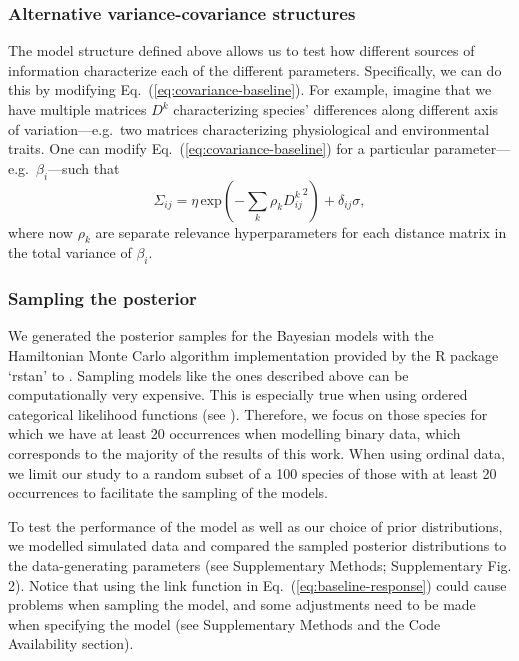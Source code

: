 \documentclass[11pt, a4paper]{article}
\begin{document}
\subsubsection*{Alternative variance-covariance structures}
The model structure defined above allows us to test how different sources of information characterize each of the different parameters. Specifically, we can do this by modifying Eq.~(\ref{eq:covariance-baseline}). For example, imagine that we have multiple matrices $D^k$ characterizing species' differences along different axis of variation---e.g.~two matrices characterizing physiological and environmental traits. One can modify Eq.~(\ref{eq:covariance-baseline}) for a particular parameter---e.g.~$\beta_{i}$---such that
\begin{equation} 
\Sigma_{ij} = \eta\,\text{exp}\left(-\sum_k\rho_{k} {D^{k}_{ij}}^2\right) + \delta_{ij} \sigma ,
\label{eq:covariance-complex}
\end{equation}
where now $\rho_{k}$ are separate relevance hyperparameters for each distance matrix in the total variance of $\beta_i$.

\subsubsection*{Sampling the posterior}
We generated the posterior samples for the Bayesian models with the Hamiltonian Monte Carlo algorithm implementation provided by the R package `rstan' to \citep{standevelopentteamRStanInterfaceStan2021}. Sampling models like the ones described above can be computationally very expensive. This is especially true when using ordered categorical likelihood functions (see \citealt{standevelopmentteamStanModelingLanguage2021}). Therefore, we focus on those species for which we have at least 20 occurrences when modelling binary data, which corresponds to the majority of the results of this work. When using ordinal data, we limit our study to a random subset of a 100 species of those with at least 20 occurrences to facilitate the sampling of the models.

To test the performance of the model as well as our choice of prior distributions, we modelled simulated data and compared the sampled posterior distributions to the data-generating parameters (see Supplementary Methods; Supplementary Fig. 2). Notice that using the link function in Eq.~(\ref{eq:baseline-response}) could cause problems when sampling the model, and some adjustments need to be made when specifying the model (see Supplementary Methods and the Code Availability section). 
\end{document}
